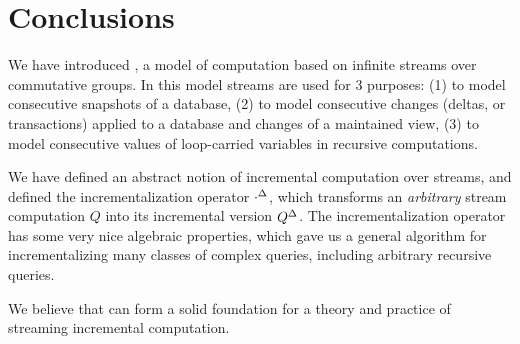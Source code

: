 \section{Conclusions}\label{sec:conclusions}%

We have introduced \dbsp, a model of computation based on infinite
streams over commutative groups.  In this model streams are used for 3
purposes: (1) to model consecutive snapshots of a database, (2) to
model consecutive changes (deltas, or transactions) applied to a
database and changes of a maintained view, (3) to model consecutive
values of loop-carried variables in recursive computations.

We have defined an abstract notion of incremental computation over
streams, and defined the incrementalization operator ${\cdot}^{\Delta}$,
which transforms an \emph{arbitrary} stream computation $Q$ into its
incremental version ${Q}^{\Delta}$.  The incrementalization operator has
some very nice algebraic properties, which gave us a general algorithm
for incrementalizing many classes of complex queries, including
arbitrary recursive queries.

We believe that \dbsp can form a solid foundation for a theory and practice of
streaming incremental computation.

